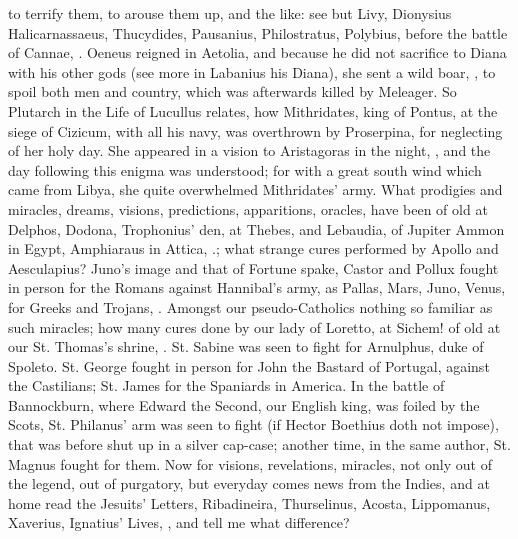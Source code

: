 {to terrify them, to arouse them up, and the like: see but Livy,
Dionysius Halicarnassaeus, Thucydides, Pausanius, Philostratus,
Polybius, before the battle of Cannae, . Oeneus reigned
in Aetolia, and because he did not sacrifice to Diana with his other
gods (see more in Labanius his Diana), she sent a wild boar, , to spoil both
men and country, which was afterwards killed by Meleager. So Plutarch
in the Life of Lucullus relates, how Mithridates, king of Pontus, at
the siege of Cizicum, with all his navy, was overthrown by Proserpina,
for neglecting of her holy day. She appeared in a vision to Aristagoras
in the night, , and the day following this enigma was understood; for
with a great south wind which came from Libya, she quite overwhelmed
Mithridates' army. What prodigies and miracles, dreams, visions,
predictions, apparitions, oracles, have been of old at Delphos, Dodona,
Trophonius' den, at Thebes, and Lebaudia, of Jupiter Ammon in Egypt,
Amphiaraus in Attica, \etc{}.; what strange cures performed by Apollo and
Aesculapius? Juno's image and that of Fortune spake, Castor
and Pollux fought in person for the Romans against Hannibal's army, as
Pallas, Mars, Juno, Venus, for Greeks and Trojans, \etc{}. Amongst our
pseudo-Catholics nothing so familiar as such miracles; how many cures
done by our lady of Loretto, at Sichem! of old at our St. Thomas's
shrine, \etc{}. St. Sabine was seen to fight for Arnulphus, duke of
Spoleto. St. George fought in person for John the Bastard of
Portugal, against the Castilians; St. James for the Spaniards in
America. In the battle of Bannockburn, where Edward the Second, our
English king, was foiled by the Scots, St. Philanus' arm was seen to
fight (if Hector Boethius doth not impose), that was before shut
up in a silver cap-case; another time, in the same author, St. Magnus
fought for them. Now for visions, revelations, miracles, not only out
of the legend, out of purgatory, but everyday comes news from the
Indies, and at home read the Jesuits' Letters, Ribadineira,
Thurselinus, Acosta, Lippomanus, Xaverius, Ignatius' Lives, \etc{}, and
tell me what difference?

}
